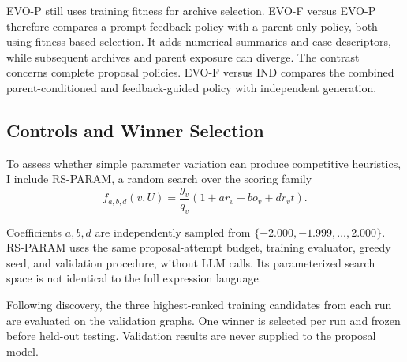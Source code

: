 EVO-P still uses training fitness for archive selection. EVO-F versus
EVO-P therefore compares a prompt-feedback policy with a parent-only
policy, both using fitness-based selection. It adds numerical summaries
and case descriptors, while subsequent archives and parent exposure can
diverge. The contrast concerns complete proposal policies.
EVO-F versus IND compares the combined parent-conditioned and
feedback-guided policy with independent generation.

\subsection{Controls and Winner Selection}

To assess whether simple parameter variation can
produce competitive heuristics, I include RS-PARAM,
a random search over the scoring family
\begin{equation}
f_{a,b,d}(v,U)=
\frac{g_v}{q_v}
(1+ar_v+bo_v+dr_vt).
\label{eq:rs}
\end{equation}

Coefficients $a,b,d$ are independently sampled from
$\{-2.000,-1.999,\ldots,2.000\}$. RS-PARAM uses
the same proposal-attempt budget, training evaluator,
greedy seed, and validation procedure, without LLM
calls. Its parameterized search space is not identical
to the full expression language.

Following discovery, the three highest-ranked training
candidates from each run are evaluated on the validation
graphs. One winner is selected per run and frozen before
held-out testing. Validation results are never supplied
to the proposal model.
